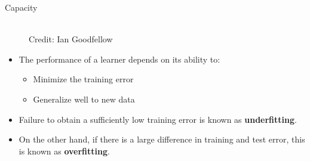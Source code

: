 \begin{vbframe} {Capacity}
  \begin{figure}
    \centering
      \tiny{\\ Credit: Ian Goodfellow}
  \end{figure}
  \vspace{-0.3cm}
  \begin{itemize}
    \item The performance of a learner depends on its ability to:
    \begin{itemize}
      \item Minimize the training error
      \item Generalize well to new data
    \end{itemize}
    \item Failure to obtain a sufficiently low training error is known as \textbf{underfitting}.
    \item On the other hand, if there is a large difference in training and test error, this is known as \textbf{overfitting}.
  \end{itemize}
  \framebreak


\end{vbframe}
